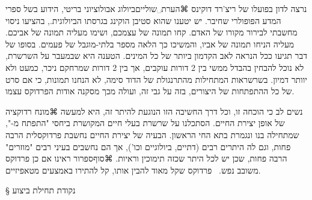 נרצה לדון בפועלו של ריצ'רד דוקינס ⌘הערת␣שוליים{ביולוג אבולוציוני בריטי, הידוע בשל ספרי המדע הפופולרי שחיבר. יש יטענו שהוא סטיבן הוקינג בגרסתו הביולוגית.}, בהציעו ניסוי מחשבתי לבירור מקורו של האדם. קחו תמונה של עצמכם, ושימו מעליה תמונה של אביכם. מעליה הניחו תמונה של אביו, והמשיכו כך הלאה מספר בלתי-מוגבל של פעמים. בסופו של דבר תגיעו ככל הנראה לאב הקדמון ביותר של כל המינים. הטענה היא שבמעבר על השרשרת, לא נוכל להבחין בהבדל ממשי בין 2 דורות עוקבים, אך בין 2 דורות שמרחקם ניכר, כמעט ולא יוותר דמיון. בשרשראות המתחילות מהתרנגולת של הדוד סימה, לא הנחנו תמונות, כי אם סרט של כל ההתפתחות של היצורים, בזה על גבי זה, ועולה מכך מסקנה אודות הפרדוקס עצמו.

נשים לב כי הוכחה זו, וכל דרך החשיבה הזו הנוגעת להיתר זה, היא למעשה ⌘מונח {רדוקציה} של אופן יצירת החיים. הסתכלנו על שרשרת בעלי חיים המקושרת ביחסי "התפתח מ-", שמתחילה בנו ונגמרת בתא החי הראשון. הבעיה של יצירת החיים נחשבת פרדוקסלית הרבה פחות, וגם לה היתרים רבים (דתיים, ביולוגיים וכו'), אך הם נחשבים בעיני רבים "מוזרים" הרבה פחות, שכן יש לכל היתר שכזה תימוכין וראיות.
⌘סוף{ספרור}
ראינו אם כן פרדוקס משובב נפש.  פרדוקס שקל מאוד להבין אותו, קל להתירו באמצעים מטאפיזיים.

§ נקודת תחילת ביצוע

